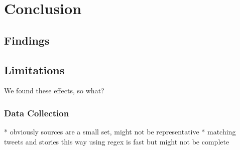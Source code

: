 \chapter{Conclusion}

\section{Findings}
 

\section{Limitations}
We found these effects, so what?
 
\subsection{Data Collection}
* obviously sources are a small set, might not be representative
* matching tweets and stories this way using regex is fast but might not be complete

 




